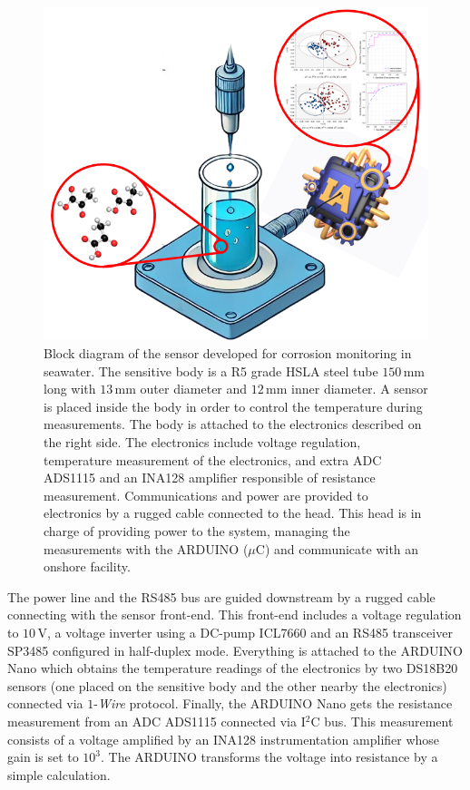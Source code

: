 \documentclass[journal,twoside,web]{ieeecolor}
\begin{document}
\begin{figure}[!t]
\centering
\includegraphics [trim = 25mm 0mm 25mm 0mm, clip, width=1\columnwidth]{figures/fig0.png}
\caption{Block diagram of the sensor developed for corrosion monitoring in seawater. The sensitive body is a R5 grade HSLA steel tube $150$\,mm long with $13$\,mm outer diameter and $12$\,mm inner diameter. A sensor is placed inside the body in order to control the temperature during measurements. The body is attached to the electronics described on the right side. The electronics include voltage regulation, temperature measurement of the electronics, and extra ADC ADS1115 and an INA128 amplifier responsible of resistance measurement. Communications and power are provided to electronics by a rugged cable connected to the head. This head is in charge of providing power to the system, managing the measurements with the ARDUINO ($\mu$C) and communicate with an onshore facility.}
\label{fig:senBlockD}
\vspace{-0.3cm}
\end{figure}

The power line and the RS485 bus are guided downstream by a rugged cable connecting with the sensor front-end. This front-end includes a voltage regulation to $10$\,V, a voltage inverter using a DC-pump ICL7660 and an RS485 transceiver SP3485 configured in half-duplex mode. Everything is attached to the ARDUINO Nano which obtains the temperature readings of the electronics by two DS18B20 sensors (one placed on the sensitive body and the other nearby the electronics) connected via $1$-\textit{Wire} protocol. Finally,  the ARDUINO Nano gets the resistance measurement from an ADC ADS1115 connected via I$^{2}$C bus. This measurement consists of a voltage amplified by an INA128 instrumentation amplifier whose gain is set to $10^{3}$. The ARDUINO transforms the voltage into resistance by a simple calculation. 
\end{document}
